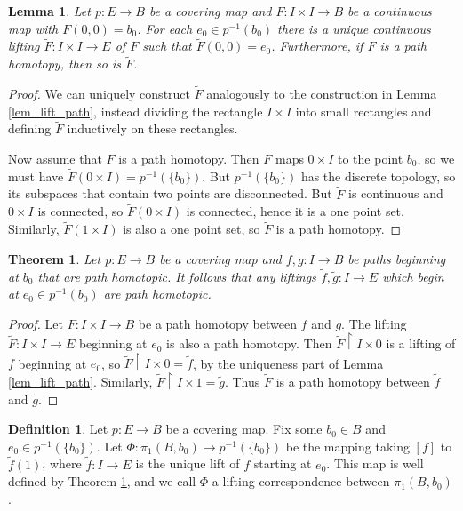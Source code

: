 \documentclass{report}
\newtheorem{theorem}{Theorem}[section]
\newtheorem{lemma}{Lemma}[section]
\theoremstyle{definition}
\newtheorem{definition}{Definition}[section]
\theoremstyle{remark}
\newcommand{\set}[1]{\{#1\}}
\begin{document}
\begin{lemma} \label{lem_lift_homotopy}
    Let $p : E \to B$ be a covering map and $F : I \times I \to B$ be a continuous map with $F(0, 0) = b_0$. For each $e_0 \in p^{-1}(b_0)$ there is a unique continuous lifting $\tilde{F} : I \times I \to E$ of $F$ such that $\tilde{F}(0, 0) = e_0$. Furthermore, if $F$ is a path homotopy, then so is $\tilde{F}$.
\end{lemma}

\begin{proof}
    We can uniquely construct $\tilde{F}$ analogously to the construction in Lemma \ref{lem_lift_path}, instead dividing the rectangle $I \times I$ into small rectangles and defining $\tilde{F}$ inductively on these rectangles.
    
    Now assume that $F$ is a path homotopy. Then $F$ maps $0 \times I$ to the point $b_0$, so we must have $\tilde{F}(0 \times I) = p^{-1}(\set{b_0})$. But $p^{-1}(\set{b_0})$ has the discrete topology, so its subspaces that contain two points are disconnected. But $\tilde{F}$ is continuous and $0 \times I$ is connected, so $\tilde{F}(0 \times I)$ is connected, hence it is a one point set. Similarly, $\tilde{F}(1 \times I)$ is also a one point set, so $\tilde{F}$ is a path homotopy.
\end{proof}

\begin{theorem} \label{thm_hom_lift_hom}
    Let $p : E \to B$ be a covering map and $f, g : I \to B$ be paths beginning at $b_0$ that are path homotopic. It follows that any liftings $\tilde{f}, \tilde{g} : I \to E$ which begin at $e_0 \in p^{-1}(b_0)$ are path homotopic.
\end{theorem}

\begin{proof}
    Let $F : I \times I \to B$ be a path homotopy between $f$ and $g$. The lifting $\tilde{F} : I \times I \to E$ beginning at $e_0$ is also a path homotopy. Then $\tilde{F}\restriction{I \times 0}$ is a lifting of $f$ beginning at $e_0$, so $\tilde{F}\restriction{I \times 0} = \tilde{f}$, by the uniqueness part of Lemma \ref{lem_lift_path}. Similarly, $\tilde{F}\restriction{I \times 1} = \tilde{g}$. Thus $\tilde{F}$ is a path homotopy between $\tilde{f}$ and $\tilde{g}$. 
\end{proof}

\begin{definition}
    Let $p : E \to B$ be a covering map. Fix some $b_0 \in B$ and $e_0 \in p^{-1}(\set{b_0})$. Let $\Phi : \pi_1(B, b_0) \to p^{-1}(\set{b_0})$ be the mapping taking $[f]$ to $\tilde{f}(1)$, where $\tilde{f} : I \to E$ is the unique lift of $f$ starting at $e_0$. This map is well defined by Theorem \ref{thm_hom_lift_hom}, and we call $\Phi$ a lifting correspondence between $\pi_1(B, b_0)$.
\end{definition}
\end{document}
